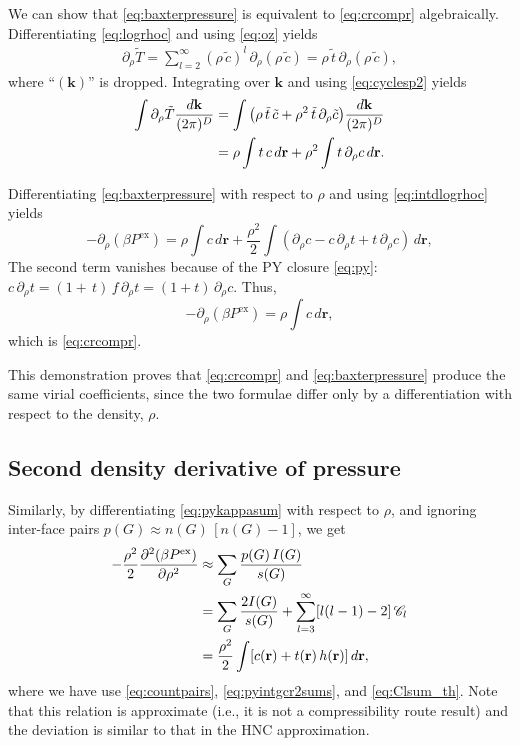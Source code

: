 \documentclass[preprint]{revtex4-1}
\newcommand{\vct}[1]{\mathbf{#1}}
\providecommand{\vr}{} %
\renewcommand{\vr}{\vct{r}}
\newcommand{\vk}{\vct{k}}
\newcommand{\dvk}{\frac{d\vk}{(2\pi)^D}}
\newcommand{\supex}[1]{ { { #1 }^{ \mathrm{ex} } } }
\newcommand{\Pex}{\supex{P}}
\newcommand{\Chn}{\mathscr{C}}
\begin{document}
We can show that
  \eqref{eq:baxterpressure} is equivalent to \eqref{eq:crcompr}
  algebraically\cite{baxterpressure}.
%
Differentiating \eqref{eq:logrhoc} and using \eqref{eq:oz} yields
%
\begin{align*}
  \partial_\rho \tilde T
=
  \sum_{l = 2}^{\infty}
    ( \rho \, \tilde{c} )^l
    \, \partial_\rho ( \rho \, \tilde{c} )
=
  \rho \, \tilde{t}
  \, \partial_\rho ( \rho \, \tilde{c} ),
\end{align*}
%
where ``$(\vk)$'' is dropped.
%
Integrating over $\vk$ and using \eqref{eq:cyclesp2} yields
%
\begin{align}
  \int \partial_\rho \tilde T \dvk
&=
  \int
    \big(
      \rho \, \tilde{t} \, \tilde{c}
      +
      \rho^2 \, \tilde{t} \, \partial_\rho \tilde{c}
    \big) \dvk
\notag \\
&=
  \rho \int t \, c \, d\vr
      +
  \rho^2 \int t \, \partial_\rho c \, d\vr.
\label{eq:intdlogrhoc}
\end{align}



Differentiating \eqref{eq:baxterpressure}
with respect to $\rho$ and using \eqref{eq:intdlogrhoc} yields
%
\[
  -\partial_\rho ( \beta \Pex )
=
  \rho \int c \, d\vr
  + \frac{\rho^2}{2} \int (
    \partial_\rho c - c \, \partial_\rho t + t \, \partial_\rho c
    ) \, d\vr,
\]
The second term vanishes because of the PY closure \eqref{eq:py}:
$c \, \partial_\rho t = (1 + \, t) \, f \, \partial_\rho t = (1 + t) \, \partial_\rho c$.
%
Thus,
\[
  -\partial_\rho ( \beta \Pex )
=
  \rho \int c \, d\vr,
\]
which is \eqref{eq:crcompr}.

This demonstration proves that
\eqref{eq:crcompr} and \eqref{eq:baxterpressure}
produce the same virial coefficients,
since the two formulae differ only
by a differentiation with respect to the density, $\rho$.




\subsection{Second density derivative of pressure}

Similarly,
  by differentiating \eqref{eq:pykappasum} with respect to $\rho$,
  and ignoring inter-face pairs $p(G) \approx n(G) \, [n(G) - 1]$,
  we get
%
\begin{align}
           -\frac{\rho^2}{2}
            \frac{\partial^2 ( \beta \Pex ) }
                 {\partial \rho^2}
  &\approx   \sum_G \frac{ p(G) \, I(G) }{ s(G) }
    \notag \\
  &=
            \sum_G \frac{2 I(G) }{s(G)}
            + \sum_{l = 3}^\infty [l(l-1) - 2] \, \Chn_l
    \notag \\
  &=         \frac{\rho^2}{2} \int [c(\vr) + t(\vr) \, h(\vr) ] \, d\vr,
\label{eq:pyddpressure}
\end{align}
%
where we have use \eqref{eq:countpairs}, \eqref{eq:pyintgcr2sums}, and \eqref{eq:Clsum_th}.
%
Note that this relation is approximate (i.e., it is not a compressibility route result)
  and the deviation is
  similar to that in the HNC approximation.
\end{document}
